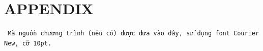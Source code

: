 \section*{APPENDIX}
\texttt{
\fontsize{10pt}{0pt}\selectfont Mã nguồn chương trình (nếu có) được đưa vào đây, sử dụng font Courier New, cỡ 10pt.}